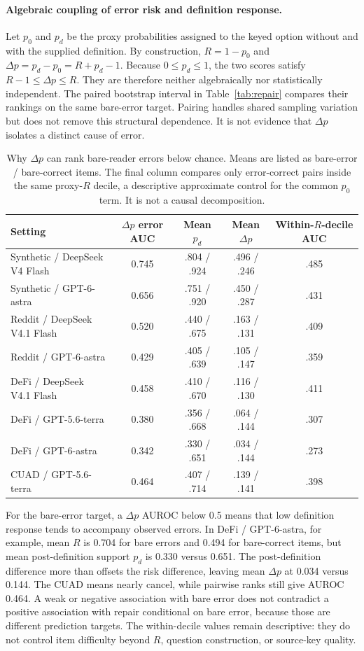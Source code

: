 \paragraph{Algebraic coupling of error risk and definition response.}\label{app:coupling}
Let $p_0$ and $p_d$ be the proxy probabilities assigned to the keyed option without and with the supplied definition. By construction, $R=1-p_0$ and $\Delta p=p_d-p_0=R+p_d-1$. Because $0\leq p_d\leq1$, the two scores satisfy $R-1\leq\Delta p\leq R$. They are therefore neither algebraically nor statistically independent. The paired bootstrap interval in Table~\ref{tab:repair} compares their rankings on the same bare-error target. Pairing handles shared sampling variation but does not remove this structural dependence. It is not evidence that $\Delta p$ isolates a distinct cause of error.

\begin{table}[h]\centering\footnotesize
\caption{Why $\Delta p$ can rank bare-reader errors below chance. Means are listed as bare-error / bare-correct items. The final column compares only error-correct pairs inside the same proxy-$R$ decile, a descriptive approximate control for the common $p_0$ term. It is not a causal decomposition.}
\label{tab:dp-coupling}
\begin{tabular}{@{}lcccc@{}}\toprule
Setting & $\Delta p$ error AUC & Mean $p_d$ & Mean $\Delta p$ & Within-$R$-decile AUC\\\midrule
Synthetic / DeepSeek V4 Flash & 0.745 & .804 / .924 & .496 / .246 & .485\\
Synthetic / GPT-6-astra & 0.656 & .751 / .920 & .450 / .287 & .431\\
Reddit / DeepSeek V4.1 Flash & 0.520 & .440 / .675 & .163 / .131 & .409\\
Reddit / GPT-6-astra & 0.429 & .405 / .639 & .105 / .147 & .359\\
DeFi / DeepSeek V4.1 Flash & 0.458 & .410 / .670 & .116 / .130 & .411\\
DeFi / GPT-5.6-terra & 0.380 & .356 / .668 & .064 / .144 & .307\\
DeFi / GPT-6-astra & 0.342 & .330 / .651 & .034 / .144 & .273\\
CUAD / GPT-5.6-terra & 0.464 & .407 / .714 & .139 / .141 & .398\\\bottomrule
\end{tabular}
\end{table}

For the bare-error target, a $\Delta p$ AUROC below 0.5 means that low definition response tends to accompany observed errors. In DeFi / GPT-6-astra, for example, mean $R$ is 0.704 for bare errors and 0.494 for bare-correct items, but mean post-definition support $p_d$ is 0.330 versus 0.651. The post-definition difference more than offsets the risk difference, leaving mean $\Delta p$ at 0.034 versus 0.144. The CUAD means nearly cancel, while pairwise ranks still give AUROC 0.464. A weak or negative association with bare error does not contradict a positive association with repair conditional on bare error, because those are different prediction targets. The within-decile values remain descriptive: they do not control item difficulty beyond $R$, question construction, or source-key quality.
